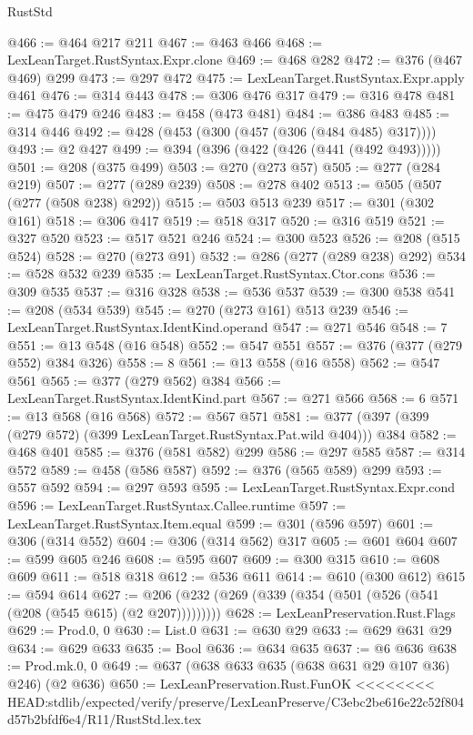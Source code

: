 \begin{lexlean}{RustStd}
\begin{coremodule}
{\begin{coremodule}
{{{{{{{{{{@466 := @464 @217 @211
@467 := @463 @466
@468 := LexLeanTarget.RustSyntax.Expr.clone
@469 := @468 @282
@472 := @376 (@467 @469) @299
@473 := @297 @472
@475 := LexLeanTarget.RustSyntax.Expr.apply @461
@476 := @314 @443
@478 := @306 @476 @317
@479 := @316 @478
@481 := @475 @479 @246
@483 := @458 (@473 @481)
@484 := @386 @483
@485 := @314 @446
@492 := @428 (@453 (@300 (@457 (@306 (@484 @485) @317))))
@493 := @2 @427
@499 := @394 (@396 (@422 (@426 (@441 (@492 @493)))))
@501 := @208 (@375 @499)
@503 := @270 (@273 @57)
@505 := @277 (@284 @219)
@507 := @277 (@289 @239)
@508 := @278 @402
@513 := @505 (@507 (@277 (@508 @238) @292))
@515 := @503 @513 @239
@517 := @301 (@302 @161)
@518 := @306 @417
@519 := @518 @317
@520 := @316 @519
@521 := @327 @520
@523 := @517 @521 @246
@524 := @300 @523
@526 := @208 (@515 @524)
@528 := @270 (@273 @91)
@532 := @286 (@277 (@289 @238) @292)
@534 := @528 @532 @239
@535 := LexLeanTarget.RustSyntax.Ctor.cons
@536 := @309 @535
@537 := @316 @328
@538 := @536 @537
@539 := @300 @538
@541 := @208 (@534 @539)
@545 := @270 (@273 @161) @513 @239
@546 := LexLeanTarget.RustSyntax.IdentKind.operand
@547 := @271 @546
@548 := 7
@551 := @13 @548 (@16 @548)
@552 := @547 @551
@557 := @376 (@377 (@279 @552) @384 @326)
@558 := 8
@561 := @13 @558 (@16 @558)
@562 := @547 @561
@565 := @377 (@279 @562) @384
@566 := LexLeanTarget.RustSyntax.IdentKind.part
@567 := @271 @566
@568 := 6
@571 := @13 @568 (@16 @568)
@572 := @567 @571
@581 := @377 (@397 (@399 (@279 @572) (@399 LexLeanTarget.RustSyntax.Pat.wild @404))) @384
@582 := @468 @401
@585 := @376 (@581 @582) @299
@586 := @297 @585
@587 := @314 @572
@589 := @458 (@586 @587)
@592 := @376 (@565 @589) @299
@593 := @557 @592
@594 := @297 @593
@595 := LexLeanTarget.RustSyntax.Expr.cond
@596 := LexLeanTarget.RustSyntax.Callee.runtime
@597 := LexLeanTarget.RustSyntax.Item.equal
@599 := @301 (@596 @597)
@601 := @306 (@314 @552)
@604 := @306 (@314 @562) @317
@605 := @601 @604
@607 := @599 @605 @246
@608 := @595 @607
@609 := @300 @315
@610 := @608 @609
@611 := @518 @318
@612 := @536 @611
@614 := @610 (@300 @612)
@615 := @594 @614
@627 := @206 (@232 (@269 (@339 (@354 (@501 (@526 (@541 (@208 (@545 @615) (@2 @207)))))))))
@628 := LexLeanPreservation.Rust.Flags
@629 := Prod.{0, 0}
@630 := List.{0}
@631 := @630 @29
@633 := @629 @631 @29
@634 := @629 @633
@635 := Bool
@636 := @634 @635
@637 := @6 @636
@638 := Prod.mk.{0, 0}
@649 := @637 (@638 @633 @635 (@638 @631 @29 @107 @36) @246) (@2 @636)
@650 := LexLeanPreservation.Rust.FunOK
<<<<<<<< HEAD:stdlib/expected/verify/preserve/LexLeanPreserve/C3ebc2be616e22c52f804d57b2bfdf6e4/R11/RustStd.lex.tex
}}}}}}}}}}
\end{coremodule}}
\end{coremodule}
\end{lexlean}
